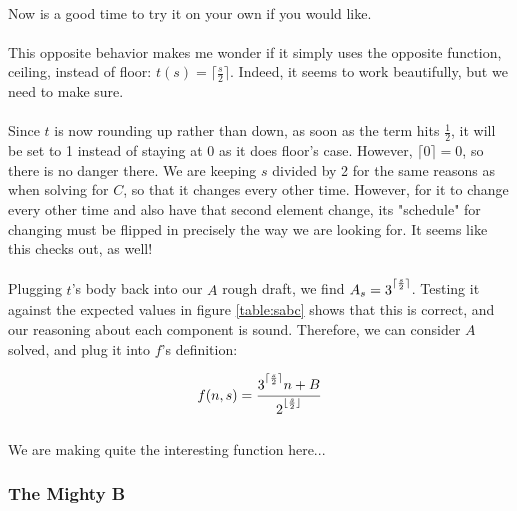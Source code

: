 \documentclass[12pt,letterpaper]{article}
\begin{document}
			\paragraph{} Now is a good time to try it on your own if you would like.
			
			
			\paragraph{} This opposite behavior makes me wonder if it simply uses the opposite function, ceiling, instead of floor: $t(s) = \lceil \frac{s}{2} \rceil$. Indeed, it seems to work beautifully, but we need to make sure.
			
			\paragraph{} Since $t$ is now rounding up rather than down, as soon as the term hits $\frac{1}{2}$, it will be set to 1 instead of staying at 0 as it does floor's case. However, $\lceil 0 \rceil = 0$, so there is no danger there. We are keeping $s$ divided by 2 for the same reasons as when solving for $C$, so that it changes every other time. However, for it to change every other time and also have that second element change, its "schedule" for changing must be flipped in precisely the way we are looking for. It seems like this checks out, as well!
			
			\paragraph{} Plugging $t$'s body back into our $A$ rough draft, we find $A_s = 3\strut^{\lceil \frac{s}{2} \rceil}$. Testing it against the expected values in figure \ref{table:sabc} shows that this is correct, and our reasoning about each component is sound. Therefore, we can consider $A$ solved, and plug it into $f$'s definition:
			
			\begin{equation*}
				f(n, s) = \frac{3\strut^{\lceil \frac{s}{2} \rceil} n + B}{2\strut^{\lfloor \frac{s}{2} \rfloor}}
			\end{equation*}
			
			\paragraph{} We are making quite the interesting function here...
			
		\newpage %
		\subsubsection{The Mighty B}
		
\end{document}
